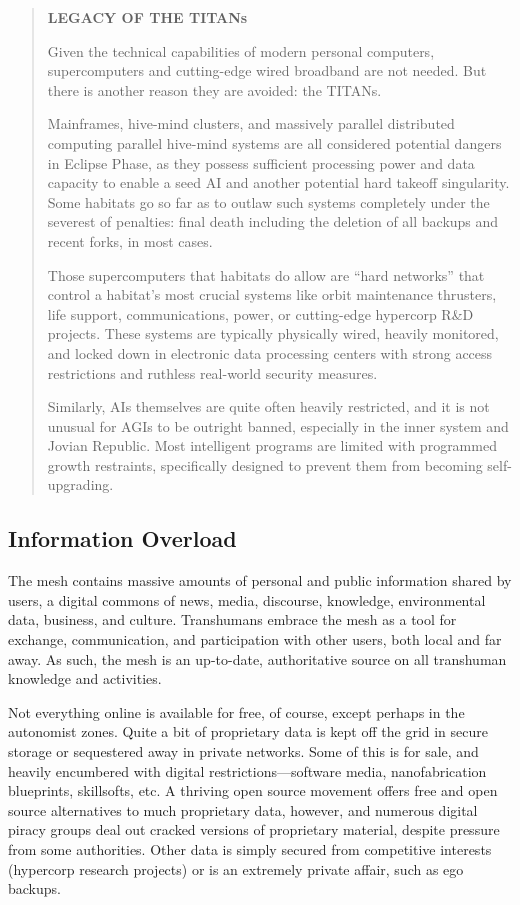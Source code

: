 \begin{quotation}
\textbf{LEGACY OF THE TITANs}

Given the technical capabilities of modern personal computers, supercomputers and cutting-edge wired
broadband are not needed. But there is another reason they are avoided: the TITANs.

Mainframes, hive-mind clusters, and massively parallel distributed computing parallel hive-mind systems
are all considered potential dangers in Eclipse Phase, as they possess sufficient processing power and data
capacity to enable a seed AI and another potential hard takeoff singularity. Some habitats go so far as to
outlaw such systems completely under the severest of penalties: final death including the deletion of all
backups and recent forks, in most cases.

Those supercomputers that habitats do allow are “hard networks” that control a habitat’s most crucial
systems like orbit maintenance thrusters, life support, communications, power, or cutting-edge hypercorp
R\&D projects. These systems are typically physically wired, heavily monitored, and locked down in electronic
data processing centers with strong access restrictions and ruthless real-world security measures.

Similarly, AIs themselves are quite often heavily restricted, and it is not unusual for AGIs to be outright
banned, especially in the inner system and Jovian Republic. Most intelligent programs are limited with
programmed growth restraints, specifically designed to prevent them from becoming self-upgrading.
\end{quotation}

\subsection{Information Overload}

The mesh contains massive amounts of personal and 
public information shared by users, a digital commons 
of news, media, discourse, knowledge, environmental 
data, business, and culture. Transhumans embrace 
the mesh as a tool for exchange, communication, 
and participation with other users, both local and far 
away. As such, the mesh is an up-to-date, authoritative 
source on all transhuman knowledge and activities.

Not everything online is available for free, of course, 
except perhaps in the autonomist zones. Quite a bit of 
proprietary data is kept off the grid in secure storage 
or sequestered away in private networks. Some of this 
is for sale, and heavily encumbered with digital restrictions—software
media, nanofabrication blueprints,
skillsofts, etc. A thriving open source movement offers 
free and open source alternatives to much proprietary 
data, however, and numerous digital piracy groups 
deal out cracked versions of proprietary material, 
despite pressure from some authorities. Other data is 
simply secured from competitive interests (hypercorp 
research projects) or is an extremely private affair, 
such as ego backups.


